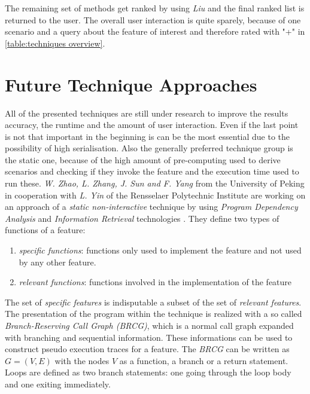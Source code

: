 The remaining set of methods get ranked by using \textit{Liu} and the final ranked list is returned to the user.
The overall user interaction is quite sparely, because of one scenario and a query about the feature of interest and therefore rated with "+" in \autoref{table:techniques overview}. \cite{revelle2010using}

\section{Future Technique Approaches}
\label{sec:SNIAFL}
All of the presented techniques are still under research to improve the results accuracy, the runtime and the amount of user interaction. Even if the last point is not that important in the beginning is can be the most essential due to the possibility of high serialisation. Also the generally preferred technique group is the static one, because of the high amount of pre-computing used to derive scenarios and checking if they invoke the feature and the execution time used to run these.\newline
\textit{W. Zhao, L. Zhang, J. Sun and F. Yang} from the University of Peking in cooperation with \textit{L. Yin} of the Rensselaer Polytechnic Institute are working on an approach of a \textit{static non-interactive} technique by using \textit{Program Dependency Analysis} and \textit{Information Retrieval} technologies \cite{zhao2006sniafl}.\newline
They define two types of functions of a feature:
\begin{enumerate}
	\item \textit{specific functions}:
	functions only used to implement the feature and not used by any other feature.
	\item \textit{relevant functions}:
	functions involved in the implementation of the feature
\end{enumerate}
The set of \textit{specific features} is indisputable a subset of the set of \textit{ relevant features}.
The presentation of the program within the technique is realized with a so called \textit{Branch-Reserving Call Graph (BRCG)}, which is a normal call graph expanded with branching and sequential information. These informations can be used to construct pseudo execution traces for a feature. The \textit{BRCG} can be written as $G=(V,E)$ with the nodes $V$ as a function, a branch or a return statement. Loops are defined as two branch statements: one going through the loop body and one exiting immediately.

